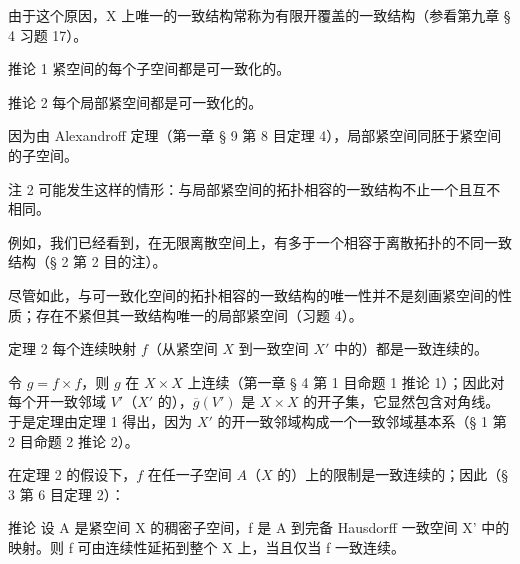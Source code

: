 由于这个原因，X 上唯一的一致结构常称为有限开覆盖的一致结构（参看第九章 § 4 习题 17）。

推论 1 紧空间的每个子空间都是可一致化的。

推论 2 每个局部紧空间都是可一致化的。

因为由 Alexandroff 定理（第一章 § 9 第 8 目定理 4），局部紧空间同胚于紧空间的子空间。

注 2 可能发生这样的情形：与局部紧空间的拓扑相容的一致结构不止一个且互不相同。

例如，我们已经看到，在无限离散空间上，有多于一个相容于离散拓扑的不同一致结构（§ 2 第 2 目的注）。

尽管如此，与可一致化空间的拓扑相容的一致结构的唯一性并不是刻画紧空间的性质；存在不紧但其一致结构唯一的局部紧空间（习题 4）。

定理 2 每个连续映射 \(f\)（从紧空间 \(X\) 到一致空间 \(X'\) 中的）都是一致连续的。

令 \(g = f \times f\)，则 \(g\) 在 \(X \times X\) 上连续（第一章 § 4 第 1 目命题 1 推论 1）；因此对每个开一致邻域 \(V'\)（\(X'\) 的），\(\overline{g}(V')\) 是 \(X \times X\) 的开子集，它显然包含对角线。于是定理由定理 1 得出，因为 \(X'\) 的开一致邻域构成一个一致邻域基本系（§ 1 第 2 目命题 2 推论 2）。

在定理 2 的假设下，\(f\) 在任一子空间 \(A\)（\(X\) 的）上的限制是一致连续的；因此（§ 3 第 6 目定理 2）：

推论 设 A 是紧空间 X 的稠密子空间，f 是 A 到完备 Hausdorff 一致空间 X' 中的映射。则 f 可由连续性延拓到整个 X 上，当且仅当 f 一致连续。

